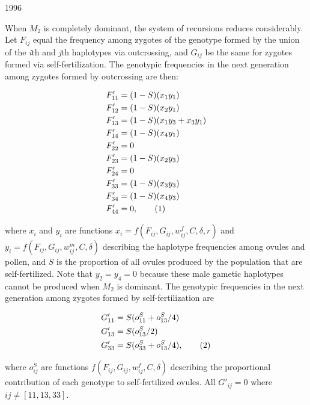 1996\documentclass[9pt,twocolumn,twoside,lineno]{gsajnl}
\newcommand\numberthis{\addtocounter{equation}{1}\tag{\theequation}}
\begin{document}
When $M_2$ is completely dominant, the system of recursions reduces considerably. Let $F_{ij}$ equal the frequency among zygotes of the genotype formed by the union of the \textit{i}th and \textit{j}th haplotypes via outcrossing, and $G_{ij}$ be the same for zygotes formed via self-fertilization. The genotypic frequencies in the next generation among zygotes formed by outcrossing are then:
\begin{linenomath}\begin{align*} \label{eq:FprGyn}
    F'_{11} &= (1 - S) (x_1 y_1)  \\
    F'_{12} &= (1 - S) (x_2 y_1)  \\
    F'_{13} &= (1 - S) (x_1 y_3 + x_3 y_1)  \\
    F'_{14} &= (1 - S) (x_4 y_1)  \\
    F'_{22} &= 0 \\
    F'_{23} &= (1 - S) (x_2 y_3)  \\
    F'_{24} &= 0 \\
    F'_{33} &= (1 - S) (x_3 y_3)  \\
    F'_{34} &= (1 - S) (x_4 y_3)  \\
    F'_{44} &= 0, \numberthis
\end{align*}\end{linenomath}

\noindent where $x_{i}$ and $y_{i}$ are functions $x_i=f(F_{ij},G_{ij},w^f_{ij},C,\delta,r)$ and $y_i=f(F_{ij},G_{ij},w^m_{ij},C,\delta)$ describing the haplotype frequencies among ovules and pollen, and $S$ is the proportion of all ovules produced by the population that are self-fertilized. Note that $y_2=y_4=0$ because these male gametic haplotypes cannot be produced when $M_2$ is dominant. The genotypic frequencies in the next generation among zygotes formed by self-fertilization are 
\begin{linenomath}\begin{align*} \label{eq:GprGyn}
    G'_{11} &= S (o^S_{11} + o^S_{13}/4) \\
    G'_{13} &= S (o^S_{13}/2) \\
    G'_{33} &= S (o^S_{33} + o^S_{13}/4), \numberthis
\end{align*} \end{linenomath}

\noindent where $o^S_{ij}$ are functions $f(F_{ij},G_{ij},w^f_{ij},C,\delta)$ describing the proportional contribution of each genotype to self-fertilized ovules. All $G'_{ij} = 0$ where $ij \neq [11,13,33]$. 
\end{document}
